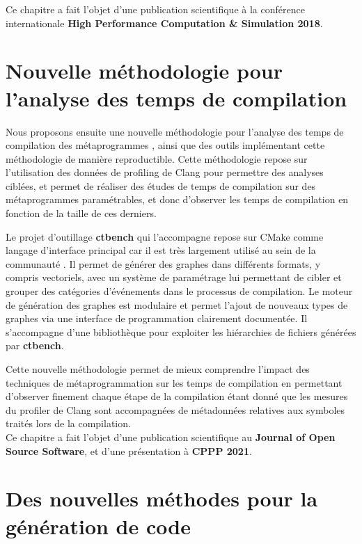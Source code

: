 \documentclass[main]{subfiles}
\begin{document}
Ce chapitre a fait l'objet d'une publication scientifique \`a la conf\'erence
internationale \textbf{High Performance Computation \& Simulation 2018}.

\section{
  Nouvelle m\'ethodologie pour l'analyse des temps de compilation
}

Nous proposons ensuite une nouvelle m\'ethodologie pour l'analyse des temps
de compilation des m\'etaprogrammes \cpp, ainsi que des outils impl\'ementant
cette m\'ethodologie de mani\`ere reproductible. Cette m\'ethodologie
repose sur l'utilisation des donn\'ees de profiling de Clang pour permettre
des analyses cibl\'ees, et permet de r\'ealiser des \'etudes de temps
de compilation sur des m\'etaprogrammes param\'etrables, et donc d'observer
les temps de compilation en fonction de la taille de ces derniers.

Le projet d'outillage \textbf{ctbench} qui l'accompagne repose sur CMake
comme langage d'interface principal car il est tr\`es largement utilis\'e
au sein de la communaut\'e \cpp. Il permet de g\'en\'erer des graphes dans
diff\'erents formats, y compris vectoriels, avec un syst\`eme de param\'etrage
lui permettant de cibler et grouper des cat\'egories d'\'ev\'enements
dans le processus de compilation.
Le moteur de g\'en\'eration des graphes est modulaire
et permet l'ajout de nouveaux types de graphes via une interface
de programmation clairement document\'ee. Il s'accompagne d'une biblioth\`eque
\cpp pour exploiter les hi\'erarchies de fichiers g\'en\'er\'ees
par \textbf{ctbench}.

Cette nouvelle m\'ethodologie permet de mieux comprendre l'impact des
techniques de m\'etaprogrammation sur les temps de compilation en permettant
d'observer finement chaque \'etape de la compilation \'etant donn\'e que les
mesures du profiler de Clang sont accompagn\'ees de m\'etadonn\'ees relatives
aux symboles \cpp trait\'es lors de la compilation.
\\

Ce chapitre a fait l'objet d'une publication scientifique au
\textbf{Journal of Open Source Software}, et d'une pr\'esentation
\`a \textbf{CPPP 2021}.

\section{
  Des nouvelles m\'ethodes pour la g\'en\'eration de code
}
\end{document}
